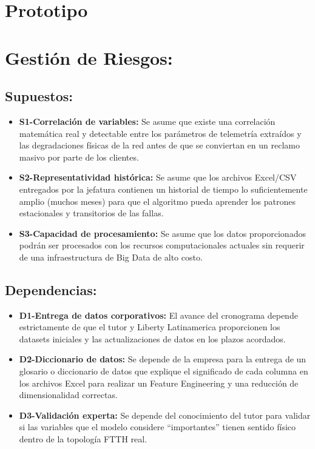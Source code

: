 \documentclass[12pt,a4paper]{article}
\begin{document}
\section{Prototipo}
                

\section{Gestión de Riesgos:}

        \subsection{\textbf{Supuestos:}}
                    \begin{itemize}
                        \item \textbf{S1-Correlación de variables:} Se asume que existe una correlación matemática real y detectable entre los parámetros de telemetría extraídos y las degradaciones físicas de la red antes de que se conviertan en un reclamo masivo por parte de los clientes.
                        \item \textbf{S2-Representatividad histórica:} Se asume que los archivos Excel/CSV entregados por la jefatura contienen un historial de tiempo lo suficientemente amplio (muchos meses) para que el algoritmo pueda aprender los patrones estacionales y transitorios de las fallas.
                        \item \textbf{S3-Capacidad de procesamiento:} Se asume que los datos proporcionados podrán ser procesados con los recursos computacionales actuales sin requerir de una infraestructura de Big Data de alto costo.
                    \end{itemize}
        \subsection{\textbf{Dependencias:}}
                    \begin{itemize}
                        \item \textbf{D1-Entrega de datos corporativos:} El avance del cronograma depende estrictamente de que el tutor y Liberty Latinamerica proporcionen los datasets iniciales y las actualizaciones de datos en los plazos acordados.
                        \item \textbf{D2-Diccionario de datos:} Se depende de la empresa para la entrega de un glosario o diccionario de datos que explique el significado de cada columna en los archivos Excel para realizar un Feature Engineering y una reducción de dimensionalidad correctas.
                        \item \textbf{D3-Validación experta:} Se depende del conocimiento del tutor para validar si las variables que el modelo considere ``importantes'' tienen sentido físico dentro de la topología FTTH real.
                    \end{itemize}
\end{document}
